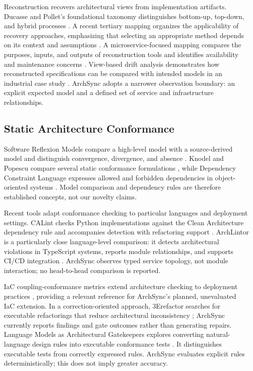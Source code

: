 \documentclass[conference]{IEEEtran}
\begin{document}
Reconstruction recovers architectural views from implementation artifacts. Ducasse and Pollet's foundational taxonomy distinguishes bottom-up, top-down, and hybrid processes \cite{ducasse2009reconstruction}. A recent tertiary mapping organizes the applicability of recovery approaches, emphasizing that selecting an appropriate method depends on its context and assumptions \cite{sar2024taxonomy}. A microservice-focused mapping compares the purposes, inputs, and outputs of reconstruction tools and identifies availability and maintenance concerns \cite{bakhtin2024mapping}. View-based drift analysis demonstrates how reconstructed specifications can be compared with intended models in an industrial case study \cite{uzun2024drift}. ArchSync adopts a narrower observation boundary: an explicit expected model and a defined set of service and infrastructure relationships.

\subsection{Static Architecture Conformance}

Software Reflexion Models compare a high-level model with a source-derived model and distinguish convergence, divergence, and absence \cite{murphy1995reflexion}. Knodel and Popescu compare several static conformance formulations \cite{knodel2007comparison}, while Dependency Constraint Language expresses allowed and forbidden dependencies in object-oriented systems \cite{terra2009dcl}. Model comparison and dependency rules are therefore established concepts, not our novelty claims.

Recent tools adapt conformance checking to particular languages and deployment settings. CALint checks Python implementations against the Clean Architecture dependency rule and accompanies detection with refactoring support \cite{calint2022}. ArchLintor is a particularly close language-level comparison: it detects architectural violations in TypeScript systems, reports module relationships, and supports CI/CD integration \cite{archlintor2025}. ArchSync observes typed service topology, not module interaction; no head-to-head comparison is reported.

IaC coupling-conformance metrics extend architecture checking to deployment practices \cite{ntentos2022iac}, providing a relevant reference for ArchSync's planned, unevaluated IaC extension. In a correction-oriented approach, 3Erefactor searches for executable refactorings that reduce architectural inconsistency \cite{refactor2024}; ArchSync currently reports findings and gate outcomes rather than generating repairs. Language Models as Architectural Gatekeepers explores converting natural-language design rules into executable conformance tests \cite{lucena2025gatekeepers}. It distinguishes executable tests from correctly expressed rules. ArchSync evaluates explicit rules deterministically; this does not imply greater accuracy.
\end{document}
